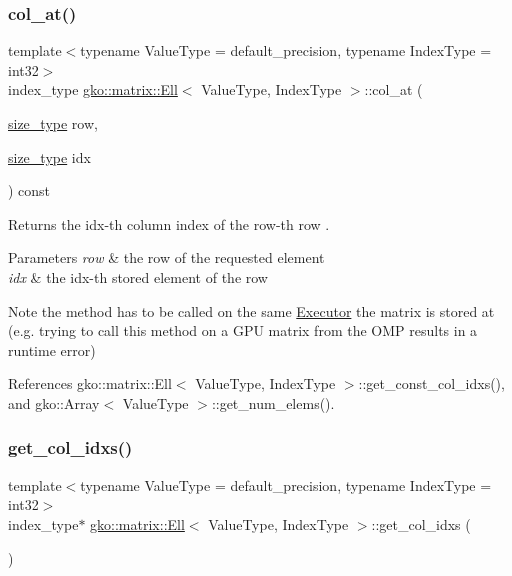 \subsubsection{\texorpdfstring{col\+\_\+at()}{col\_at()}\hspace{0.1cm}{\footnotesize\ttfamily [2/2]}}
{\footnotesize\ttfamily template$<$typename Value\+Type = default\+\_\+precision, typename Index\+Type = int32$>$ \\
index\+\_\+type \hyperlink{classgko_1_1matrix_1_1Ell}{gko\+::matrix\+::\+Ell}$<$ Value\+Type, Index\+Type $>$\+::col\+\_\+at (\begin{DoxyParamCaption}\item[{\hyperlink{namespacegko_a6e5c95df0ae4e47aab2f604a22d98ee7}{size\+\_\+type}}]{row,  }\item[{\hyperlink{namespacegko_a6e5c95df0ae4e47aab2f604a22d98ee7}{size\+\_\+type}}]{idx }\end{DoxyParamCaption}) const\hspace{0.3cm}{\ttfamily [noexcept]}}



Returns the {\ttfamily idx}-\/th column index of the {\ttfamily row}-\/th row . 


\begin{DoxyParams}{Parameters}
{\em row} & the row of the requested element \\
\hline
{\em idx} & the idx-\/th stored element of the row\\
\hline
\end{DoxyParams}
\begin{DoxyNote}{Note}
the method has to be called on the same \hyperlink{classgko_1_1Executor}{Executor} the matrix is stored at (e.\+g. trying to call this method on a G\+PU matrix from the O\+MP results in a runtime error) 
\end{DoxyNote}


References gko\+::matrix\+::\+Ell$<$ Value\+Type, Index\+Type $>$\+::get\+\_\+const\+\_\+col\+\_\+idxs(), and gko\+::\+Array$<$ Value\+Type $>$\+::get\+\_\+num\+\_\+elems().

\mbox{\label{classgko_1_1matrix_1_1Ell_ac80ca9482997e97d88425214fd1b8aef}} 
\subsubsection{\texorpdfstring{get\+\_\+col\+\_\+idxs()}{get\_col\_idxs()}}
{\footnotesize\ttfamily template$<$typename Value\+Type = default\+\_\+precision, typename Index\+Type = int32$>$ \\
index\+\_\+type$\ast$ \hyperlink{classgko_1_1matrix_1_1Ell}{gko\+::matrix\+::\+Ell}$<$ Value\+Type, Index\+Type $>$\+::get\+\_\+col\+\_\+idxs (\begin{DoxyParamCaption}{ }\end{DoxyParamCaption})\hspace{0.3cm}{\ttfamily [noexcept]}}



